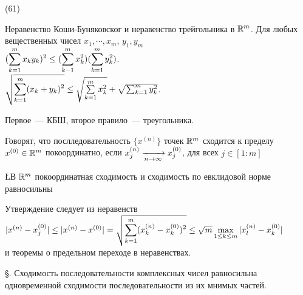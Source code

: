 (61)

\T \q Неравенство Коши-Буняковског и неравенство трейгольника в $\mathbb{R}^m$. Для любых вещественных чисел $x_1, \cdots, x_m$, $y_1, y_m$\\
$(\displaystyle\sum\limits^{m}_{k = 1} x_k y_k)^2 \le (\sum\limits^m_{k - 1} x^2_k)(\sum\limits^m_{k = 1} y^2_k)$.\\
$\sqrt{\displaystyle\sum\limits^m_{k = 1}(x_k + y_k)^2} \le \sqrt{\sum\limits^m_{k = 1}x^2_k} + \sqrt{\sum^m_{k = 1} y^2_k}$.

\D Первое~--- КБШ, второе правило~--- треугольника.

\Op Говорят, что послледовательность $\{x^{(n)}\}$ точек $\mathbb{R}^m$ сходится к пределу $x^{(0)} \in \mathbb{R}^m$ покоординатно, если $x^{(n)}_j \xrightarrow[n\to \infty]{} x^{(0)}_j$, для всех $j \in [1: m]$

\L В $\mathbb{R}^m$ покоординатная сходимость и сходимость по евклидовой норме равносильны

\D Утверждение следует из неравенств\\
$|x^{(n)} - x^{(0)}_j| \le |x^{(n)} - x^{(0)}| = \sqrt{\displaystyle\sum\limits^m_{k = 1} (x^{(n)}_k - x^{(0)}_k)^2}\le \sqrt{m} \max\limits_{1\le k\le m} |x^{(n)}_l - x^{(0)}_k|$\\
и теоремы о предельном переходе в неравенствах.

\S. Сходимость последовательности комплексных чисел равносильна одновременной сходимости последовательности из их мнимых частей.